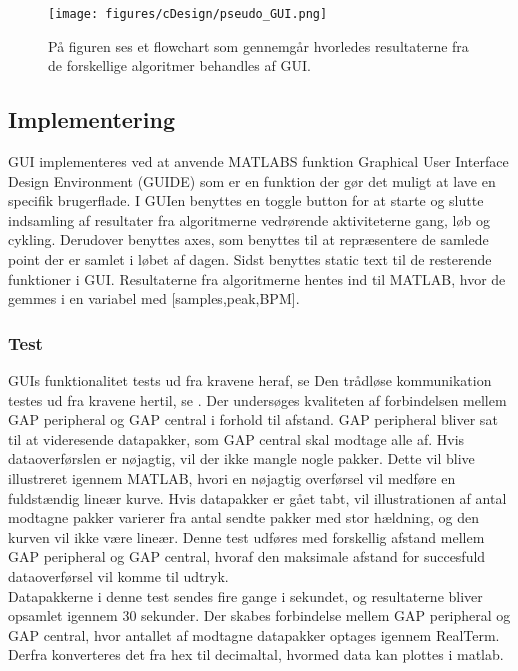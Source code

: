 \begin{figure}[H]
	\centering
	\texttt{[image: figures/cDesign/pseudo\_GUI.png]}
	\caption{På figuren ses et flowchart som gennemgår hvorledes resultaterne fra de forskellige algoritmer behandles af GUI.}
	\label{fig:GUI}
\end{figure}

\subsection{Implementering}
GUI implementeres ved at anvende MATLABS funktion Graphical User Interface Design Environment (GUIDE) som er en funktion der gør det muligt at lave en specifik brugerflade. I GUIen benyttes en toggle button for at starte og slutte indsamling af resultater fra algoritmerne vedrørende aktiviteterne gang, løb og cykling. Derudover benyttes axes, som benyttes til at repræsentere de samlede point der er samlet i løbet af dagen. Sidst benyttes static text til de resterende funktioner i GUI. \newline
Resultaterne fra algoritmerne hentes ind til MATLAB, hvor de gemmes i en variabel med [samples,peak,BPM].

\subsubsection{Test}
GUIs funktionalitet tests ud fra kravene heraf, se 
Den trådløse kommunikation testes ud fra kravene hertil, se . Der undersøges kvaliteten af forbindelsen mellem GAP peripheral og GAP central i forhold til afstand. GAP peripheral bliver sat til at videresende datapakker, som GAP central skal modtage alle af. Hvis dataoverførslen er nøjagtig, vil der ikke mangle nogle pakker. Dette vil blive illustreret igennem MATLAB, hvori en nøjagtig overførsel vil medføre en fuldstændig lineær kurve. Hvis datapakker er gået tabt, vil illustrationen af antal modtagne pakker varierer fra antal sendte pakker med stor hældning, og den kurven vil ikke være lineær. Denne test udføres med forskellig afstand mellem GAP peripheral og GAP central, hvoraf den maksimale afstand for succesfuld dataoverførsel vil komme til udtryk. \\
Datapakkerne i denne test sendes fire gange i sekundet, og resultaterne bliver opsamlet igennem 30 sekunder. Der skabes forbindelse mellem GAP peripheral og GAP central, hvor antallet af modtagne datapakker optages igennem RealTerm. Derfra konverteres det fra hex til decimaltal, hvormed data kan plottes i matlab.